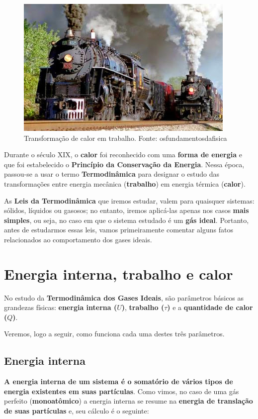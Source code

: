 \documentclass[12pt]{article}
\begin{document}
\begin{figure}[h]{}
\centering\includegraphics[width=2.5truein]{img1.jpg}
\caption{Transformação de calor em trabalho. Fonte: osfundamentosdafisica}
\centering
\end{figure}

Durante o século XIX, o \textbf{calor} foi reconhecido com uma \textbf{forma de energia} e que foi estabelecido o \textbf{Princípio da Conservação da Energia}. Nessa época, passou-se a usar o termo \textbf{Termodinâmica} para designar o estudo das transformações entre energia mecânica (\textbf{trabalho}) em energia térmica (\textbf{calor}).


As \textbf{Leis da Termodinâmica} que iremos estudar, valem para quaisquer sistemas: sólidos, líquidos ou gasosos; no entanto, iremos aplicá-las apenas nos casos \textbf{mais simples}, ou seja, no caso em que o sistema estudado é um \textbf{gás ideal}. Portanto, antes de estudarmos essas leis, vamos primeiramente comentar alguns fatos relacionados ao comportamento dos gases ideais.


\hypertarget{x-energia-interna,-trabalho-e-calor}{\section{Energia interna, trabalho e calor}}
No estudo da \textbf{Termodinâmica dos Gases Ideais}, são parâmetros básicos as grandezas físicas: \textbf{energia interna ($U$)}, \textbf{trabalho ($\tau$)} e a \textbf{quantidade de calor ($Q$)}.


Veremos, logo a seguir, como funciona cada uma destes três parâmetros.


\hypertarget{x-energia-interna}{\subsection{Energia interna}}
\textbf{A energia interna de um sistema é o somatório de vários tipos de energia existentes em suas partículas}. Como vimos, no caso de uma gás perfeito (\textbf{monoatômico}) a energia interna se resume na \textbf{energia de translação de suas partículas} e, seu cálculo é o seguinte:
\end{document}
